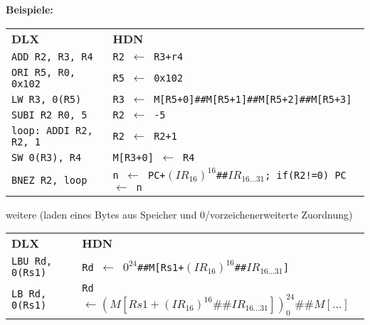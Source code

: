 \documentclass[8pt,a4paper]{article}
\begin{document}
\begin{multicols}{2}
\textbf{Beispiele:}\\
\begin{tabular}{ll}
\textbf{DLX} & \textbf{HDN}\\
\texttt{ADD R2, R3, R4} & \texttt{R2 $\leftarrow$ R3+r4}\\
\texttt{ORI R5, R0, 0x102} & \texttt{R5 $\leftarrow$ 0x102}\\
\texttt{LW R3, 0(R5)} & \texttt{R3 $\leftarrow$ M[R5+0]\#\#M[R5+1]\#\#M[R5+2]\#\#M[R5+3]}\\
\texttt{SUBI R2 R0, 5} & \texttt{R2 $\leftarrow$ -5}\\
\texttt{loop: ADDI R2, R2, 1} & \texttt{R2 $\leftarrow$ R2+1}\\
\texttt{SW 0(R3), R4} & \texttt{M[R3+0] $\leftarrow$ R4}\\
\texttt{BNEZ R2, loop} & \texttt{n $\leftarrow$ PC+$(IR_{16})^{16}$\#\#$IR_{16\ldots31}$; if(R2!=0) PC $\leftarrow$ n}\\
\end{tabular}
weitere (laden eines Bytes aus Speicher und 0/vorzeichenerweiterte Zuordnung)\\
\begin{tabular}{ll}
\textbf{DLX} & \textbf{HDN}\\
\texttt{LBU Rd, 0(Rs1)} & \texttt{Rd $\leftarrow$ $0^{24}$\#\#M[Rs1+$(IR_{16})^{16}$\#\#$IR_{16\ldots 31}$]}\\
\texttt{LB Rd, 0(Rs1)} & \texttt{Rd $\leftarrow(M[Rs1+(IR_{16})^{16}\#\#IR_{16\ldots 31}])^{24}_0\#\#M[\ldots]$}\\
\end{tabular}

\end{multicols}
\end{document}
